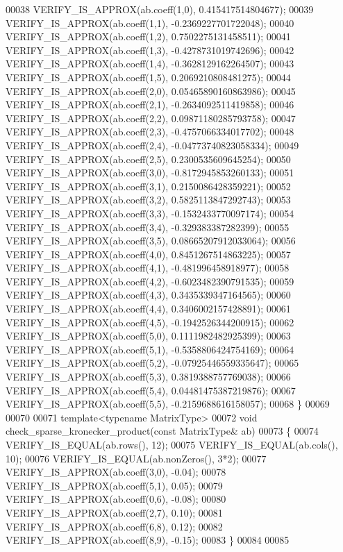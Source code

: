 \begin{DoxyCode}
00038   VERIFY\_IS\_APPROX(ab.coeff(1,0),  0.415417514804677);
00039   VERIFY\_IS\_APPROX(ab.coeff(1,1), -0.2369227701722048);
00040   VERIFY\_IS\_APPROX(ab.coeff(1,2),  0.7502275131458511);
00041   VERIFY\_IS\_APPROX(ab.coeff(1,3), -0.4278731019742696);
00042   VERIFY\_IS\_APPROX(ab.coeff(1,4), -0.3628129162264507);
00043   VERIFY\_IS\_APPROX(ab.coeff(1,5),  0.2069210808481275);
00044   VERIFY\_IS\_APPROX(ab.coeff(2,0),  0.05465890160863986);
00045   VERIFY\_IS\_APPROX(ab.coeff(2,1), -0.2634092511419858);
00046   VERIFY\_IS\_APPROX(ab.coeff(2,2),  0.09871180285793758);
00047   VERIFY\_IS\_APPROX(ab.coeff(2,3), -0.4757066334017702);
00048   VERIFY\_IS\_APPROX(ab.coeff(2,4), -0.04773740823058334);
00049   VERIFY\_IS\_APPROX(ab.coeff(2,5),  0.2300535609645254);
00050   VERIFY\_IS\_APPROX(ab.coeff(3,0), -0.8172945853260133);
00051   VERIFY\_IS\_APPROX(ab.coeff(3,1),  0.2150086428359221);
00052   VERIFY\_IS\_APPROX(ab.coeff(3,2),  0.5825113847292743);
00053   VERIFY\_IS\_APPROX(ab.coeff(3,3), -0.1532433770097174);
00054   VERIFY\_IS\_APPROX(ab.coeff(3,4), -0.329383387282399);
00055   VERIFY\_IS\_APPROX(ab.coeff(3,5),  0.08665207912033064);
00056   VERIFY\_IS\_APPROX(ab.coeff(4,0),  0.8451267514863225);
00057   VERIFY\_IS\_APPROX(ab.coeff(4,1), -0.481996458918977);
00058   VERIFY\_IS\_APPROX(ab.coeff(4,2), -0.6023482390791535);
00059   VERIFY\_IS\_APPROX(ab.coeff(4,3),  0.3435339347164565);
00060   VERIFY\_IS\_APPROX(ab.coeff(4,4),  0.3406002157428891);
00061   VERIFY\_IS\_APPROX(ab.coeff(4,5), -0.1942526344200915);
00062   VERIFY\_IS\_APPROX(ab.coeff(5,0),  0.1111982482925399);
00063   VERIFY\_IS\_APPROX(ab.coeff(5,1), -0.5358806424754169);
00064   VERIFY\_IS\_APPROX(ab.coeff(5,2), -0.07925446559335647);
00065   VERIFY\_IS\_APPROX(ab.coeff(5,3),  0.3819388757769038);
00066   VERIFY\_IS\_APPROX(ab.coeff(5,4),  0.04481475387219876);
00067   VERIFY\_IS\_APPROX(ab.coeff(5,5), -0.2159688616158057);
00068 \}
00069 
00070 
00071 \textcolor{keyword}{template}<\textcolor{keyword}{typename} MatrixType>
00072 \textcolor{keywordtype}{void} check\_sparse\_kronecker\_product(\textcolor{keyword}{const} MatrixType& ab)
00073 \{
00074   VERIFY\_IS\_EQUAL(ab.rows(), 12);
00075   VERIFY\_IS\_EQUAL(ab.cols(), 10);
00076   VERIFY\_IS\_EQUAL(ab.nonZeros(), 3*2);
00077   VERIFY\_IS\_APPROX(ab.coeff(3,0), -0.04);
00078   VERIFY\_IS\_APPROX(ab.coeff(5,1),  0.05);
00079   VERIFY\_IS\_APPROX(ab.coeff(0,6), -0.08);
00080   VERIFY\_IS\_APPROX(ab.coeff(2,7),  0.10);
00081   VERIFY\_IS\_APPROX(ab.coeff(6,8),  0.12);
00082   VERIFY\_IS\_APPROX(ab.coeff(8,9), -0.15);
00083 \}
00084 
00085 

\end{DoxyCode}
